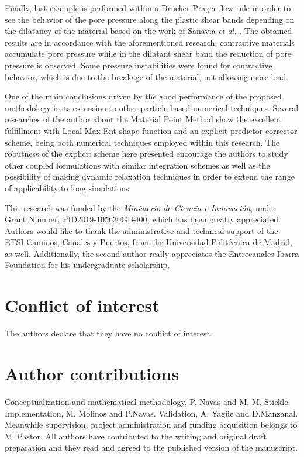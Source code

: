 \documentclass[twocolumn]{svjour3}          %
\begin{document}
Finally, last example is performed within a Drucker-Prager  flow  rule  in  order  to  see  the  behavior  of  the pore  pressure  along  the  plastic  shear  bands  depending  on  the  dilatancy  of  the  material based on the work of Sanavia \textit{et al.} \cite{Sanavia:02b}. The obtained results are in accordance with the aforementioned research: contractive materials accumulate pore pressure  while  in  the  dilatant  shear  band  the  reduction of pore pressure is observed. Some  pressure  instabilities  were  found  for contractive behavior, which is due to the breakage of the material, not allowing more load.

One of the main conclusions driven by the good performance of the proposed methodology is its extension to other particle based numerical techniques. Several researches of the author about the Material Point Method show the excellent fulfillment with Local Max-Ent shape function and an explicit predictor-corrector scheme, being both numerical techniques employed within this research. The robutness of the explicit scheme here presented encourage the authors to study other coupled formulations with similar integration schemes as well as the possibility of making dynamic relaxation techniques in order to extend the range of applicability to long simulations.

\begin{acknowledgements}
This research was funded by the \textit{Ministerio de Ciencia e Innovaci\'on}, under Grant Number, PID2019-105630GB-I00, which has been greatly appreciated. Authors would like to thank the administrative and technical support of the ETSI Caminos, Canales y Puertos, from the Universidad Polit\'ecnica de Madrid, as well. Additionally, the second author really appreciates the Entrecanales Ibarra Foundation for his undergraduate scholarship.
\end{acknowledgements}


%
\section*{Conflict of interest}
The authors declare that they have no conflict of interest.

\section*{Author contributions}
Conceptualization and mathematical methodology, P. Navas and M. M. Stickle. Implementation, M. Molinos and P.Navas. Validation, A. Yag\"ue and D.Manzanal. Meanwhile supervision, project administration and funding acquisition belongs to M. Pastor. All authors have contributed to the writing and original draft preparation and they read and agreed to the published version of the manuscript.
\end{document}
